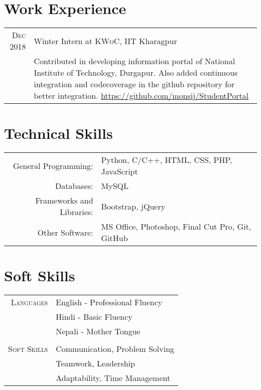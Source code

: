 \documentclass[a4paper,10pt]{article}
\begin{document}
\section{Work Experience}
\begin{tabular}{r|p{11cm}}
 
 \textsc{Dec 2018} & Winter Intern at \textsc{KWoC}, IIT Kharagpur \\&\footnotesize{Contributed in developing information portal of National Institute of Technology, Durgapur. Also added continuous integration and codecoverage in the github repository for better integration.} \url{https://github.com/monsij/StudentPortal}\\
\end{tabular}


\section{Technical Skills}
\begin{tabular}{rl}
 General Programming:& Python, C/C++, HTML, CSS, PHP, JavaScript\\
 Databases:& MySQL \\
 Frameworks and Libraries:& Bootstrap, jQuery \\
 Other Software: &  MS Office, Photoshop, Final Cut Pro, Git, GitHub\\
 
\end{tabular}
\section{Soft Skills}
\begin{tabular}{rl}
\textsc{Languages} &English - Professional Fluency\\&Hindi - Basic Fluency \\&Nepali - Mother Tongue\\ \\
\textsc{Soft Skills} &Communication, Problem Solving  \\ &Teamwork, Leadership \\ &Adaptability, Time Management\end{tabular}
\end{document}

